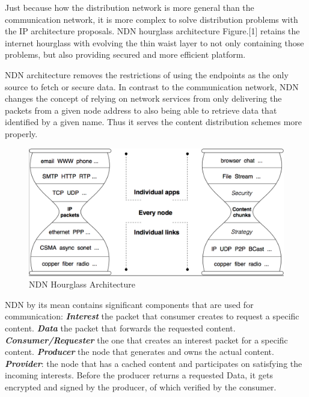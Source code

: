 \documentclass[conference]{IEEEtran}
\begin{document}
Just because how the distribution network is more general than the communication network, it is more complex to solve distribution problems with the IP architecture proposals. NDN hourglass architecture Figure.[1] retains the internet hourglass with evolving the thin waist layer to not only containing those problems, but also providing secured and more efficient platform.

NDN architecture removes the restrictions of using the endpoints as the only source to fetch or secure data. In contrast to the communication network, NDN changes the concept of relying on network services from only delivering the packets from a given node address to also being able to retrieve data that identified by a given name. Thus it serves the content distribution schemes more properly.
\begin{figure} [ht]
    \centering
    \includegraphics[width=\columnwidth]{hourglass.png}
    \caption{ \small NDN Hourglass Architecture}
    \label{fig:my_label}
\end{figure}

NDN by its mean contains significant components that are used for communication: \textbf{\textit{Interest}} the packet that consumer creates to request a specific content. \textbf{\textit{Data}} the packet that forwards the requested content. \textbf{\textit{Consumer/Requester}} the one that creates an interest packet for a specific content. \textbf{\textit{Producer}} the node that generates and owns the actual content. \textbf{\textit{Provider}}: the node that has a cached content and participates on satisfying the incoming interests. Before the producer returns a requested Data, it gets encrypted and signed by the producer, of which verified by the consumer. 
\end{document}
